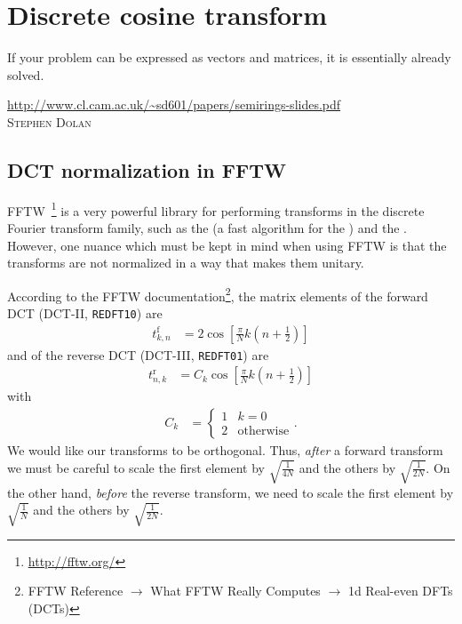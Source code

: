 \chapter{Discrete cosine transform}

\label{chap:dct}

\epigraph{
If your problem can be expressed as vectors and matrices, it is essentially already solved.
}{
\url{http://www.cl.cam.ac.uk/~sd601/papers/semirings-slides.pdf} \\
\textsc{Stephen Dolan}
}


\section{DCT normalization in FFTW}

FFTW~\cite{frigo2005design}\footnote{
	\url{http://fftw.org/}
} is a very powerful library for performing transforms in the discrete Fourier transform family, such as the  (a fast algorithm for the ) and the .
However, one nuance which must be kept in mind when using FFTW is that the transforms are not normalized in a way that makes them unitary.

According to the FFTW documentation\footnote{
	FFTW Reference $\to$ What FFTW Really Computes $\to$ 1d Real-even DFTs (DCTs)
}, the matrix elements of the forward DCT (DCT-II, \texttt{REDFT10}) are
\begin{align}
	t^\textrm{f}_{k,n}
	&= 2 \cos{\left[ \frac{\pi}{N} k \left( n + \frac{1}{2} \right) \right]}
\end{align}
and of the reverse DCT (DCT-III, \texttt{REDFT01}) are
\begin{align}
	t^\textrm{r}_{n,k}
	&= C_k \cos{\left[ \frac{\pi}{N} k \left( n + \frac{1}{2} \right) \right]}
\end{align}
with
\begin{align}
	C_k
	&= \begin{cases}
			1 & k = 0 \\
			2 & \text{otherwise}
		\end{cases}.
\end{align}
We would like our transforms to be orthogonal.
Thus, \emph{after} a forward transform we must be careful to scale the first element by $\sqrt{\frac{1}{4 N}}$ and the others by $\sqrt{\frac{1}{2 N}}$.
On the other hand, \emph{before} the reverse transform, we need to scale the first element by $\sqrt{\frac{1}{N}}$ and the others by $\sqrt{\frac{1}{2 N}}$.


